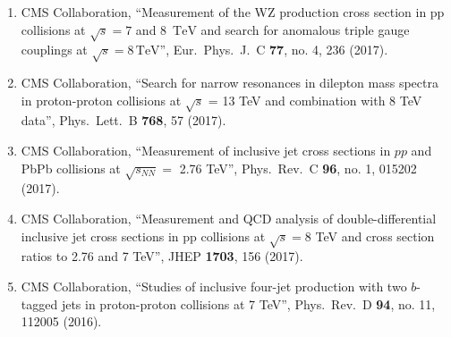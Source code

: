 \begin{enumerate}
\item CMS Collaboration, ``Measurement of the WZ production cross section in pp collisions at $\sqrt{s} = 7$ and 8 $\,\text{TeV}$ and search for anomalous triple gauge couplings at $\sqrt{s} = 8\,\text{TeV} $'', Eur.\ Phys.\ J.\ C {\bf 77}, no. 4, 236 (2017).

\item CMS Collaboration, ``Search for narrow resonances in dilepton mass spectra in proton-proton collisions at $\sqrt{s}$ = 13 TeV and combination with 8 TeV data'', Phys.\ Lett.\ B {\bf 768}, 57 (2017).

\item CMS Collaboration, ``Measurement of inclusive jet cross sections in $pp$ and PbPb collisions at $\sqrt{s_{NN}}=$ 2.76 TeV'', Phys.\ Rev.\ C {\bf 96}, no. 1, 015202 (2017).

\item CMS Collaboration, ``Measurement and QCD analysis of double-differential inclusive jet cross sections in pp collisions at $ \sqrt{s}=8 $ TeV and cross section ratios to 2.76 and 7 TeV'', JHEP {\bf 1703}, 156 (2017).

\item CMS Collaboration, ``Studies of inclusive four-jet production with two $b$-tagged jets in proton-proton collisions at 7 TeV'', Phys.\ Rev.\ D {\bf 94}, no. 11, 112005 (2016).


\end{enumerate}
